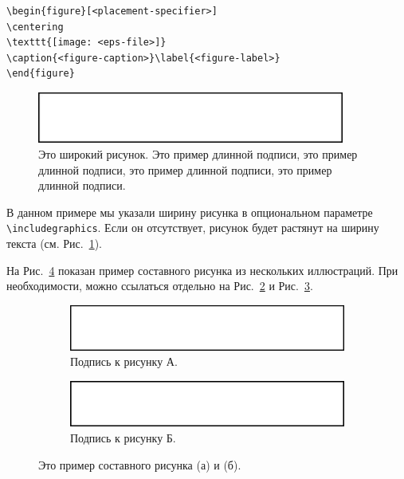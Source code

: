 \documentclass[pdflatex,sn-mathphys-gost]{pmi-jnl}
\begin{document}
\bigskip
\begin{verbatim}
\begin{figure}[<placement-specifier>]
\centering
\texttt{[image: <eps-file>]}
\caption{<figure-caption>}\label{<figure-label>}
\end{figure}
\end{verbatim}
\bigskip

\begin{figure}[ht]
\centering
\includegraphics[width=0.9\textwidth]{fig.eps}
\caption{Это широкий рисунок. Это пример длинной подписи, это пример длинной подписи, это пример длинной подписи, это пример длинной подписи.}\label{fig1}
\end{figure}

В данном примере мы указали ширину рисунка в опциональном параметре \verb+\includegraphics+. Если он отсутствует, рисунок будет растянут на ширину текста (см. Рис.~\ref{fig1}).

На Рис.~\ref{fig2} показан пример составного рисунка из нескольких иллюстраций. При необходимости, можно ссылаться отдельно на Рис.~\ref{fig2a} и Рис.~\ref{fig2b}.

\begin{figure}[h]
\centering
\begin{subfigure}{0.49\textwidth}
    \includegraphics[width=0.99\linewidth]{fig.eps}
    \caption{Подпись к рисунку А.}
    \label{fig2a}
\end{subfigure}
\begin{subfigure}{0.49\textwidth}
    \includegraphics[width=0.99\linewidth]{fig.png}
    \caption{Подпись к рисунку Б.}
    \label{fig2b}
\end{subfigure}
\caption{Это пример составного рисунка (а) и (б).}
\label{fig2}
\end{figure}
\end{document}
